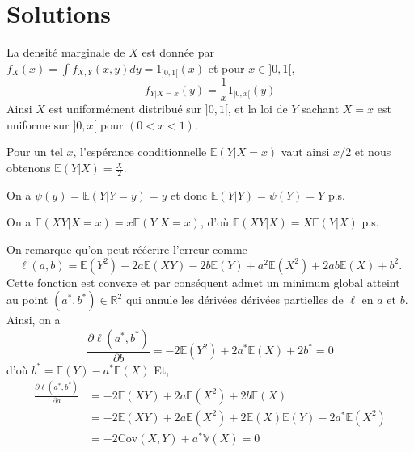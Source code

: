 \chapter{Solutions}

\label{III-answer-etb1}
La densité marginale de \(X\) est donnée par
\(f_X(x) = \int f_{X,Y}(x,y) dy = 1_{]0,1[}(x)\) et pour
\(x \in ]0,1[\), \[f_{Y|X=x} (y) = \frac{1}{x} 1_{]0,x[}(y)\] Ainsi
\(X\) est uniformément distribué sur \(]0,1[\), et la loi de \(Y\)
sachant \(X =x\) est uniforme sur \(]0,x[\) pour \((0 < x < 1)\).

\label{III-answer-etb2}
Pour un tel \(x\), l'espérance conditionnelle \(\mathbb{E}(Y|X=x)\) vaut
ainsi \(x/2\) et nous obtenons \(\mathbb{E}(Y|X) = \frac{X}{2}\).

\label{III-answer-autocond}
On a \(\psi(y) = \mathbb{E}(Y|Y=y) = y\) et donc
\(\mathbb{E}(Y|Y) = \psi(Y) = Y\) p.s.

\label{III-answer-prod}
On a \(\mathbb{E}(XY|X = x) = x\mathbb{E}(Y|X=x)\), d'où
\(\mathbb{E}(XY|X) = X\mathbb{E}(Y|X)\) p.s.

\label{III-answer-detail}
On remarque qu'on peut réécrire l'erreur comme
\[\ell(a,b)= \mathbb{E}(Y^2) -2a\mathbb{E}(XY) -2b \mathbb{E}(Y) +a^2\mathbb{E}(X^2) +2ab\mathbb{E}(X) +b^2.\]
Cette fonction est convexe et par conséquent admet un minimum global
atteint au point \((a^*, b^*)\in\mathbb{R}^2\) qui annule les dérivées
dérivées partielles de \(\ell\) en \(a\) et \(b\). Ainsi, on a
\[\frac{\partial \ell(a^*,b^*)}{\partial b} = -2\mathbb{E}(Y^2) + 2a^* \mathbb{E}(X) + 2b^*=0\]
d'où \(b^* = \mathbb{E}(Y) - a^* \mathbb{E}(X)\) Et, \[\begin{aligned}
\frac{\partial \ell(a^*,b^*)}{\partial a} & = -2\mathbb{E}(XY) + 2a \mathbb{E}(X^2) + 2b \mathbb{E}(X)\\
                                   & = -2\mathbb{E}(XY) + 2a \mathbb{E}(X^2) + 2\mathbb{E}(X)\mathbb{E}(Y) - 2 a^* \mathbb{E}(X^2)\\
                                   & = -2\text{Cov}(X,Y) + a^*\mathbb{V}(X)=0
\end{aligned}\]

